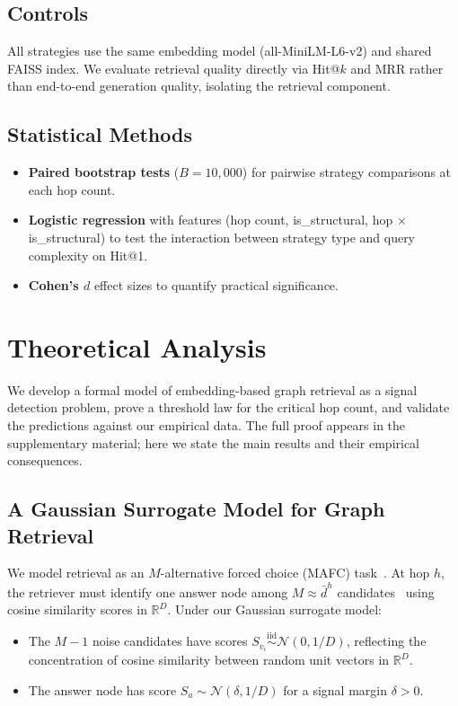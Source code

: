 \documentclass[11pt]{article}
\begin{document}
\subsection{Controls}

All strategies use the same embedding model (all-MiniLM-L6-v2) and shared FAISS index. We evaluate retrieval quality directly via Hit@$k$ and MRR rather than end-to-end generation quality, isolating the retrieval component.

\subsection{Statistical Methods}

\begin{itemize}
    \item \textbf{Paired bootstrap tests} ($B = 10{,}000$) for pairwise strategy comparisons at each hop count.
    \item \textbf{Logistic regression} with features (hop count, is\_structural, hop $\times$ is\_structural) to test the interaction between strategy type and query complexity on Hit@1.
    \item \textbf{Cohen's $d$} effect sizes to quantify practical significance.
\end{itemize}

\section{Theoretical Analysis}

We develop a formal model of embedding-based graph retrieval as a signal detection problem, prove a threshold law for the critical hop count, and validate the predictions against our empirical data. The full proof appears in the supplementary material; here we state the main results and their empirical consequences.

\subsection{A Gaussian Surrogate Model for Graph Retrieval}

We model retrieval as an $M$-alternative forced choice (MAFC) task~\citep{green1966}. At hop $h$, the retriever must identify one answer node among $M \approx \bar{d}^h$ candidates~\citep{vanderhofstad2017} using cosine similarity scores in $\mathbb{R}^D$. Under our Gaussian surrogate model:
\begin{itemize}
    \item The $M - 1$ noise candidates have scores $S_{v_i} \stackrel{\text{iid}}{\sim} \mathcal{N}(0, 1/D)$, reflecting the concentration of cosine similarity between random unit vectors in $\mathbb{R}^D$.
    \item The answer node has score $S_a \sim \mathcal{N}(\delta, 1/D)$ for a signal margin $\delta > 0$.
\end{itemize}
\end{document}
